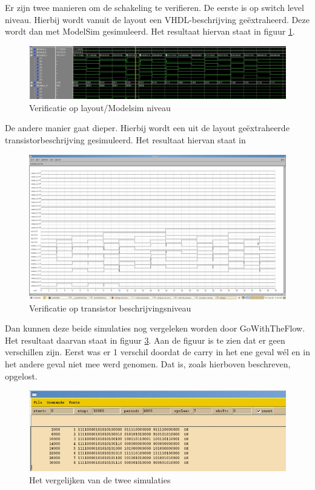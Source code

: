 Er zijn twee manieren om de schakeling te verifieren. De eerste is op switch level niveau. Hierbij wordt vanuit de layout een VHDL-beschrijving geëxtraheerd. Deze wordt dan met ModelSim gesimuleerd. Het resultaat hiervan staat in figuur \ref{b}.
\begin{figure} [h!]
\includegraphics [width=\linewidth]{figures/sim_extractedd}
\caption{Verificatie op layout/Modelsim niveau}
\label{b}
\end{figure}
De andere manier gaat dieper. Hierbij wordt  een uit de layout geëxtraheerde transistorbeschrijving gesimuleerd. Het resultaat hiervan staat in 
\begin{figure} [h!]
\includegraphics [width=\linewidth]{figures/switch-level}
\caption{Verificatie op transistor beschrijvingsniveau}
\label{a}
\end{figure}
Dan kunnen deze beide simulaties nog vergeleken worden door GoWithTheFlow. Het resultaat daarvan staat in figuur \ref{c}. Aan de figuur is te zien dat er geen verschillen zijn. Eerst was er 1 verschil doordat de carry in het ene geval wél en in het andere geval niet mee werd genomen. Dat is, zoals hierboven beschreven, opgelost. 
\begin{figure} [h!]
\includegraphics [width=\linewidth]{figures/comparez}
\caption{Het vergelijken van de twee simulaties}
\label{c}
\end{figure}















